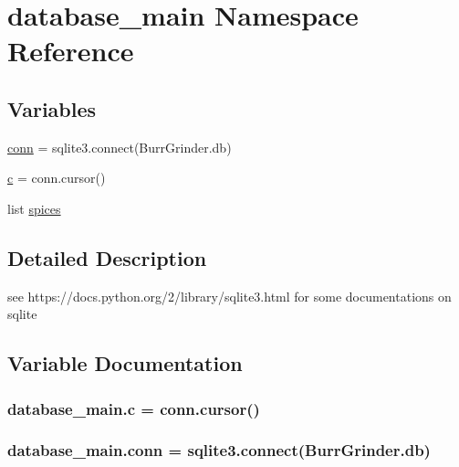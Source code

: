 \hypertarget{namespacedatabase__main}{}\section{database\+\_\+main Namespace Reference}
\label{namespacedatabase__main}
\subsection*{Variables}
\begin{DoxyCompactItemize}
\item 
\hyperlink{namespacedatabase__main_a97500d979f679a8c65726206743b23cd}{conn} = sqlite3.\+connect(\textquotesingle{}Burr\+Grinder.\+db\textquotesingle{})
\item 
\hyperlink{namespacedatabase__main_a743bad65b64272a167e04ff18661efce}{c} = conn.\+cursor()
\item 
list \hyperlink{namespacedatabase__main_a5c9eb9043541b4a2ddee70e65511fca3}{spices}
\end{DoxyCompactItemize}


\subsection{Detailed Description}
\begin{DoxyVerb}see 
https://docs.python.org/2/library/sqlite3.html
for some documentations on sqlite
\end{DoxyVerb}
 

\subsection{Variable Documentation}
\subsubsection[{\texorpdfstring{c}{c}}]{\setlength{\rightskip}{0pt plus 5cm}database\+\_\+main.\+c = conn.\+cursor()}\hypertarget{namespacedatabase__main_a743bad65b64272a167e04ff18661efce}{}\label{namespacedatabase__main_a743bad65b64272a167e04ff18661efce}
\subsubsection[{\texorpdfstring{conn}{conn}}]{\setlength{\rightskip}{0pt plus 5cm}database\+\_\+main.\+conn = sqlite3.\+connect(\textquotesingle{}Burr\+Grinder.\+db\textquotesingle{})}\hypertarget{namespacedatabase__main_a97500d979f679a8c65726206743b23cd}{}\label{namespacedatabase__main_a97500d979f679a8c65726206743b23cd}
